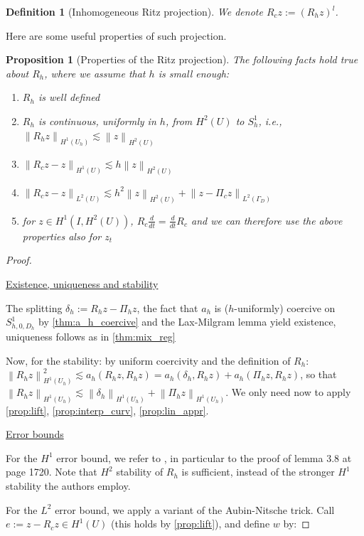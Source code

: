\documentclass[english,a4paper,9pt,oneside]{scrbook}	%
\theoremstyle{break}
\newtheorem{defn}[equation]{Definition}
\newtheorem{prop}[equation]{Proposition}
\newenvironment{mproof}[1][\proofname]{%
  \begin{proof}[#1]$ $\par\nobreak\ignorespaces
}{%
  \end{proof}
}
\renewcommand*{\proofname}{Proof}
\theoremstyle{remark}
\newcommand{\norm}[1]{\left\lVert#1\right\rVert}
\begin{document}
\begin{appendices}
\begin{defn}[Inhomogeneous Ritz projection]
We denote $R_c z := (R_h z)^l$.

\end{defn}

Here are some useful properties of such projection.

\begin{prop}[Properties of the Ritz projection]
\label{prop:ritz}
The following facts hold true about $R_h$, where we assume that $h$ is small enough:

\begin{enumerate}
	\item $R_h$ is well defined
	\item $R_h$ is continuous, uniformly in $h$, from $H^2(U)$ to $S^1_h$, i.e., $\norm{R_hz}_{H^1(U_h)}\lesssim \norm{z}_{H^2(U)}$
	\item $\norm{R_c z - z}_{H^1(U)}\lesssim h\norm{z}_{H^2(U)}$
	\item $\norm{R_c z - z}_{L^2(U)}\lesssim h^2 \norm{z}_{H^2(U)} + \norm{z-\Pi_c z}_{L^2(\Gamma_D)}$
	\item for $z \in H^1(I,H^2(U))$, $R_c \frac{d}{dt} = \frac{d}{dt} R_c$ and we can therefore use the above properties also for $z_t$
\end{enumerate}

\end{prop}

\begin{mproof}

\underline{Existence, uniqueness and stability}

The splitting $\delta_h := R_h z - \Pi_h z$, the fact that $a_h$ is ($h$-uniformly) coercive on $S^1_{h,0,D_h}$ by \cref{thm:a_h_coercive} and the Lax-Milgram lemma yield existence, uniqueness follows as in \cref{thm:mix_reg}

Now, for the stability: by uniform coercivity and the definition of $R_h$: $\norm{R_h z}_{H^1(U_h)}^2 \lesssim a_h(R_h z, R_h z) = a_h(\delta_h,R_h z) + a_h(\Pi_h z, R_h z)$, so that $\norm{R_h z}_{H^1(U_h)} \lesssim \norm{\delta_h }_{H^1(U_h)} + \norm{\Pi_h z }_{H^1(U_h)}$. We only need now to apply \cref{prop:lift}, \cref{prop:interp_curv}, \cref{prop:lin_appr}.

\underline{Error bounds}

For the $H^1$ error bound, we refer to \cite{ranner}, in particular to the proof of lemma 3.8 at page 1720. Note that $H^2$ stability of $R_h$ is sufficient, instead of the stronger $H^1$ stability the authors employ.

For the $L^2$ error bound, we apply a variant of the Aubin-Nitsche trick. Call $e:= z - R_c z \in H^1(U)$ (this holds by \cref{prop:lift}), and define $w$ by:


\end{mproof}
\end{appendices}
\end{document}
